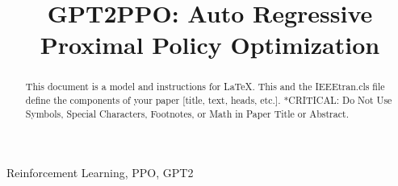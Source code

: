 \def\BibTeX{{\rm B\kern-.05em{\sc i\kern-.025em b}\kern-.08em
    T\kern-.1667em\lower.7ex\hbox{E}\kern-.125emX}}


\title{GPT2PPO: Auto Regressive Proximal Policy Optimization\\
}

\author{
\and
{}
}

\maketitle


\begin{abstract}
    This document is a model and instructions for \LaTeX.
    This and the IEEEtran.cls file define the components of your paper [title, text, heads, etc.]. *CRITICAL: Do Not Use Symbols, Special Characters, Footnotes, 
    or Math in Paper Title or Abstract.
\end{abstract}

\begin{IEEEkeywords}
    Reinforcement Learning, PPO, GPT2
\end{IEEEkeywords}


